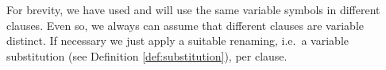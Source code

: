 

\begin{remark}
	For brevity, we have used and will use the same variable symbols in different clauses.
	Even so, we always can assume that different clauses are variable distinct.
	If necessary we just apply a suitable renaming, i.e.~a variable substitution (see Definition \vref{def:substitution}), per clause.
\end{remark}

